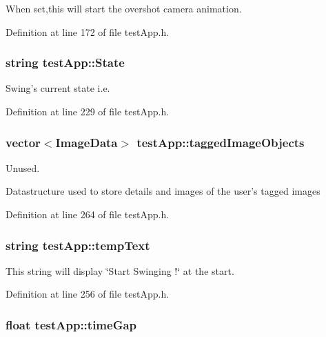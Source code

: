 When set,this will start the overshot camera animation. 



Definition at line 172 of file test\-App.\-h.

\hypertarget{classtest_app_a8ce5505df4526abed238956b65956edd}{
\subsubsection[{State}]{\setlength{\rightskip}{0pt plus 5cm}string test\-App\-::\-State}}\label{classtest_app_a8ce5505df4526abed238956b65956edd}


Swing's current state i.\-e. 



Definition at line 229 of file test\-App.\-h.

\hypertarget{classtest_app_af65c8dc2f4620bfe7fdf6a39043cb48d}{
\subsubsection[{tagged\-Image\-Objects}]{\setlength{\rightskip}{0pt plus 5cm}vector$<${\bf Image\-Data}$>$ test\-App\-::tagged\-Image\-Objects}}\label{classtest_app_af65c8dc2f4620bfe7fdf6a39043cb48d}


Unused. 

Datastructure used to store details and images of the user's tagged images 

Definition at line 264 of file test\-App.\-h.

\hypertarget{classtest_app_ad9a4beab6f2e0f13d32b00b502e89bdc}{
\subsubsection[{temp\-Text}]{\setlength{\rightskip}{0pt plus 5cm}string test\-App\-::temp\-Text}}\label{classtest_app_ad9a4beab6f2e0f13d32b00b502e89bdc}


This string will display \char`\"{}\-Start Swinging !\char`\"{} at the start. 



Definition at line 256 of file test\-App.\-h.

\hypertarget{classtest_app_a944f2713019239a4b49241a5cc9a00c9}{
\subsubsection[{time\-Gap}]{\setlength{\rightskip}{0pt plus 5cm}float test\-App\-::time\-Gap}}\label{classtest_app_a944f2713019239a4b49241a5cc9a00c9}


